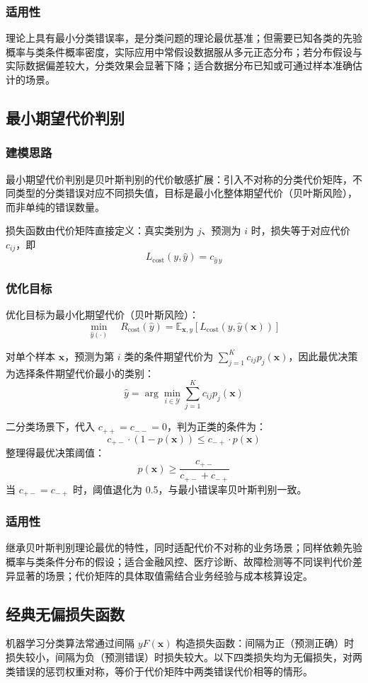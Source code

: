 \documentclass[12pt,a4paper]{article}
\newcommand{\x}{\boldsymbol{x}}
\begin{document}
\subsubsection{适用性}
理论上具有最小分类错误率，是分类问题的理论最优基准；但需要已知各类的先验概率与类条件概率密度，实际应用中常假设数据服从多元正态分布；若分布假设与实际数据偏差较大，分类效果会显著下降；适合数据分布已知或可通过样本准确估计的场景。

\subsection{最小期望代价判别}
\subsubsection{建模思路}
最小期望代价判别是贝叶斯判别的代价敏感扩展：引入不对称的分类代价矩阵，不同类型的分类错误对应不同损失值，目标是最小化整体期望代价（贝叶斯风险），而非单纯的错误数量。

损失函数由代价矩阵直接定义：真实类别为 $j$、预测为 $i$ 时，损失等于对应代价 $c_{ij}$，即
$$
L_{\text{cost}}(y, \hat{y}) = c_{\hat{y}\, y}
$$

\subsubsection{优化目标}
优化目标为最小化期望代价（贝叶斯风险）：
$$
\min_{\hat{y}(\cdot)} \quad R_{\text{cost}}(\hat{y}) = \mathbb{E}_{\x, y} \left[ L_{\text{cost}}(y, \hat{y}(\x)) \right]
$$

对单个样本 $\x$，预测为第 $i$ 类的条件期望代价为 $\sum_{j=1}^K c_{ij} p_j(\x)$，因此最优决策为选择条件期望代价最小的类别：
$$
\hat{y} = \arg\min_{i \in \mathcal{Y}} \sum_{j=1}^K c_{ij} p_j(\x)
$$

二分类场景下，代入 $c_{++}=c_{--}=0$，判为正类的条件为：
$$
c_{+-} \cdot (1-p(\x)) \leq c_{-+} \cdot p(\x)
$$
整理得最优决策阈值：
$$
p(\x) \geq \frac{c_{+-}}{c_{+-} + c_{-+}}
$$
当 $c_{+-} = c_{-+}$ 时，阈值退化为 0.5，与最小错误率贝叶斯判别一致。

\subsubsection{适用性}
继承贝叶斯判别理论最优的特性，同时适配代价不对称的业务场景；同样依赖先验概率与类条件分布的假设；适合金融风控、医疗诊断、故障检测等不同误判代价差异显著的场景；代价矩阵的具体取值需结合业务经验与成本核算设定。

\subsection{经典无偏损失函数}
机器学习分类算法常通过间隔 $yF(\x)$ 构造损失函数：间隔为正（预测正确）时损失较小，间隔为负（预测错误）时损失较大。以下四类损失均为无偏损失，对两类错误的惩罚权重对称，等价于代价矩阵中两类错误代价相等的情形。
\end{document}
